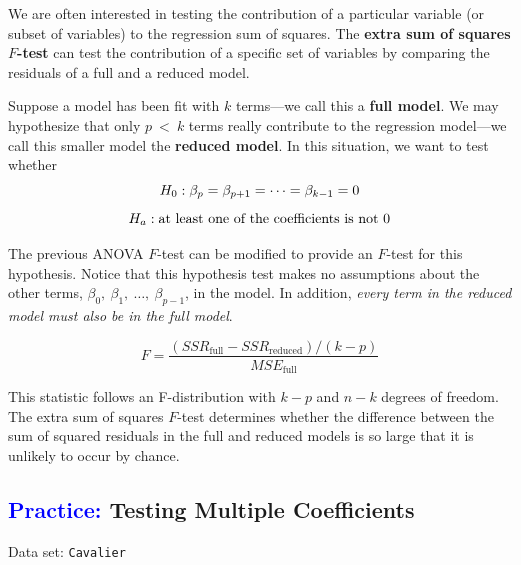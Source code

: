 \documentclass[
]{report}
\begin{document}
We are often interested in testing the contribution of a particular variable (or subset of variables) to the regression sum of squares. The \textbf{extra sum of squares \(\scriptstyle F\)-test} can test the contribution of a specific set of variables by comparing the residuals of a full and a reduced model.

Suppose a model has been fit with \(\scriptstyle k\) terms---we call this a \textbf{full model}. We may hypothesize that only \(\scriptstyle p \ <\  k\) terms really contribute to the regression model---we call this smaller model the \textbf{reduced model}. In this situation, we want to test whether
\begin{equation}
H_0: \beta_p = \beta_{p+1} = \dots = \beta_{k-1} = 0 
\notag
\end{equation}
\begin{equation}
H_a: \text{at least one of the coefficients is not }0 
\notag
\end{equation}

The previous ANOVA \(\scriptstyle F\)-test can be modified to provide an \(\scriptstyle F\)-test for this hypothesis. Notice that this hypothesis test makes no assumptions about the other terms, \(\scriptstyle \beta_0,\  \beta_1,\  \dots, \ \beta_{p-1}\), in the model. In addition, \emph{every term in the reduced model must also be in the full model}.

\begin{equation}
 F = \frac{(SSR_{\text{full}} - SSR_{\text{reduced}})/(k - p)}{MSE_{\text{full}}}
 \tag{3.12}
\end{equation}

This statistic follows an F-distribution with \(\scriptstyle k-p\) and \(\scriptstyle n-k\) degrees of freedom. The extra sum of squares \(\scriptstyle F\)-test determines whether the difference between the sum of squared residuals in the full and reduced models is so large that it is unlikely to occur by chance.

\hypertarget{testing-multiple-coefficients}{%
\subsection*{\texorpdfstring{\textcolor{blue}{Practice:} Testing Multiple Coefficients}{ Testing Multiple Coefficients}}\label{testing-multiple-coefficients}}

Data set: \texttt{Cavalier}
\end{document}
